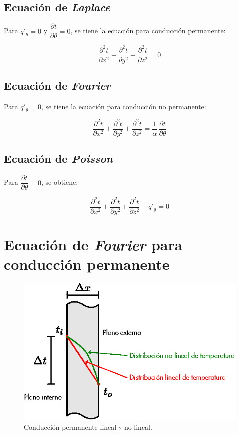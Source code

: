 \subsection{Ecuación de \emph{Laplace}}
Para $q'_g=0$ y $\dfrac{\partial t}{\partial\theta}=0$, se tiene la ecuación
para conducción permanente:

\begin{equation}
    \frac{\partial^{2}t}{\partial x^2}
    +\frac{\partial^{2}t}{\partial y^2}
    +\frac{\partial^{2}t}{\partial z^2}=0
    \label{laplace}
\end{equation}

\subsection{Ecuación de \emph{Fourier}}
Para $q'_g=0$, se tiene la ecuación para conducción no permanente:

\begin{equation}
    \frac{\partial^{2}t}{\partial x^2}
    +\frac{\partial^{2}t}{\partial y^2}
    +\frac{\partial^{2}t}{\partial z^2}
    =\frac{1}{\alpha}\,\frac{\partial t}{\partial\theta}
    \label{fourier}
\end{equation}

\subsection{Ecuación de \emph{Poisson}}
Para $\dfrac{\partial t}{\partial\theta}=0$, se obtiene:

\begin{equation}
    \frac{\partial^{2}t}{\partial x^2}
    +\frac{\partial^{2}t}{\partial y^2}
    +\frac{\partial^{2}t}{\partial z^2}+q'_g=0
    \label{poisson}
\end{equation}

\section{Ecuación de \emph{Fourier} para conducción permanente}

\begin{figure}[!h]
\centering
\includegraphics[scale=1.20]{figura02_03.eps}
\caption{Conducción permanente lineal y no lineal.}
\end{figure}

